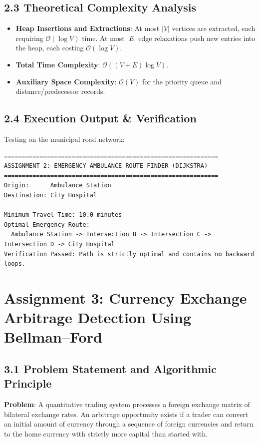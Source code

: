 \documentclass[12pt]{article}
\begin{document}
\subsection*{2.3 Theoretical Complexity Analysis}
\begin{itemize}
    \item \textbf{Heap Insertions and Extractions}: At most $|V|$ vertices are extracted, each requiring $\mathcal{O}(\log V)$ time. At most $|E|$ edge relaxations push new entries into the heap, each costing $\mathcal{O}(\log V)$.
    \item \textbf{Total Time Complexity}: $\mathcal{O}((V + E) \log V)$.
    \item \textbf{Auxiliary Space Complexity}: $\mathcal{O}(V)$ for the priority queue and distance/predecessor records.
\end{itemize}

\subsection*{2.4 Execution Output \& Verification}
Testing on the municipal road network:
\begin{lstlisting}
============================================================
ASSIGNMENT 2: EMERGENCY AMBULANCE ROUTE FINDER (DIJKSTRA)
============================================================
Origin:      Ambulance Station
Destination: City Hospital

Minimum Travel Time: 10.0 minutes
Optimal Emergency Route:
  Ambulance Station -> Intersection B -> Intersection C -> Intersection D -> City Hospital
Verification Passed: Path is strictly optimal and contains no backward loops.
\end{lstlisting}

\newpage

\section*{Assignment 3: Currency Exchange Arbitrage Detection Using Bellman--Ford}

\subsection*{3.1 Problem Statement and Algorithmic Principle}
\textbf{Problem}: A quantitative trading system processes a foreign exchange matrix of bilateral exchange rates. An arbitrage opportunity exists if a trader can convert an initial amount of currency through a sequence of foreign currencies and return to the home currency with strictly more capital than started with.
\end{document}
